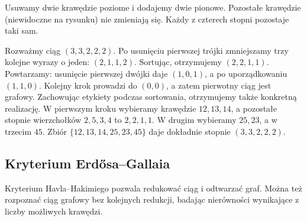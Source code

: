 \begin{center}
\begin{minipage}{\linewidth}
\centering
{}

{\footnotesize Usuwamy dwie krawędzie poziome i dodajemy
dwie pionowe. Pozostałe krawędzie (niewidoczne na rysunku)
nie zmieniają się. Każdy z czterech stopni pozostaje taki sam.}
\end{minipage}
\end{center}

\begin{przyklad}
Rozważmy ciąg $(3,3,2,2,2)$. Po usunięciu
pierwszej trójki zmniejszamy trzy kolejne wyrazy o jeden:
$(2,1,1,2)$. Sortując, otrzymujemy $(2,2,1,1)$.
Powtarzamy: usunięcie pierwszej dwójki daje
$(1,0,1)$, a po uporządkowaniu $(1,1,0)$.
Kolejny krok prowadzi do $(0,0)$, a zatem
pierwotny ciąg jest grafowy. Zachowując etykiety podczas
sortowania, otrzymujemy także konkretną realizację.
W pierwszym kroku wybieramy krawędzie $12,13,14$,
a pozostałe stopnie wierzchołków $2,5,3,4$ to $2,2,1,1$.
W drugim wybieramy $25,23$, a w trzecim $45$.
Zbiór $\{12,13,14,25,23,45\}$ daje dokładnie
stopnie $(3,3,2,2,2)$.
\end{przyklad}

\subsection{Kryterium Erdősa--Gallaia}
\label{sec:tg-erdos-gallai}

Kryterium Havla--Hakimiego pozwala redukować ciąg i odtwarzać
graf. Można też rozpoznać ciąg grafowy bez kolejnych redukcji,
badając nierówności wynikające z liczby możliwych krawędzi.

